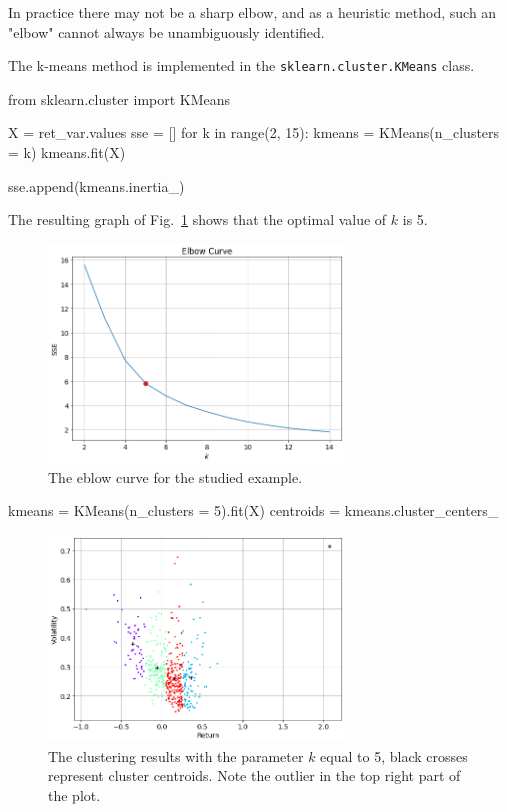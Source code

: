 In practice there may not be a sharp elbow, and as a heuristic method, such an "elbow" cannot always be unambiguously identified.

The k-means method is implemented in the \texttt{sklearn.cluster.KMeans} class.

\begin{ipythonnon} 
from sklearn.cluster import KMeans
 
X =  ret_var.values 
sse = []
for k in range(2, 15):
    kmeans = KMeans(n_clusters = k)
    kmeans.fit(X)
   
    sse.append(kmeans.inertia_) 
\end{ipythonnon}
 
The resulting graph of Fig.~\ref{fig:elbow_curve} shows that the optimal value of $k$ is 5.

\begin{figure}
\centering
\includegraphics[width=0.7\textwidth]{figures/elbow_curve}
\caption{The eblow curve for the studied example.}
\label{fig:elbow_curve}
\end{figure}

\begin{ipythonnon} 
kmeans = KMeans(n_clusters = 5).fit(X)
centroids = kmeans.cluster_centers_
\end{ipythonnon}

\begin{figure}
\centering
\includegraphics[width=0.7\textwidth]{figures/k_means_5}
\caption{The clustering results with the parameter $k$ equal to 5, black crosses represent cluster centroids. Note the outlier in the top right part of the plot.}
\label{fig:K_means_5}
\end{figure}
 
